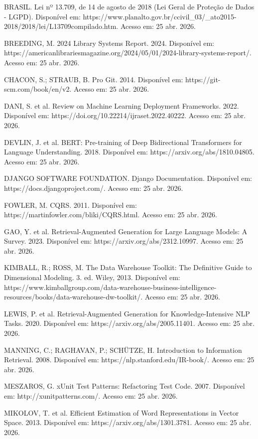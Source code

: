 \documentclass[
]{article}
\begin{document}
BRASIL. Lei nº 13.709, de 14 de agosto de 2018 (Lei Geral de Proteção de
Dados - LGPD). Disponível em:
https://www.planalto.gov.br/ccivil\_03/\_ato2015-2018/2018/lei/L13709compilado.htm.
Acesso em: 25 abr. 2026.

BREEDING, M. 2024 Library Systems Report. 2024. Disponível em:
https://americanlibrariesmagazine.org/2024/05/01/2024-library-systems-report/.
Acesso em: 25 abr. 2026.

CHACON, S.; STRAUB, B. Pro Git. 2014. Disponível em:
https://git-scm.com/book/en/v2. Acesso em: 25 abr. 2026.

DANI, S. et al. Review on Machine Learning Deployment Frameworks. 2022.
Disponível em: https://doi.org/10.22214/ijraset.2022.40222. Acesso em:
25 abr. 2026.

DEVLIN, J. et al. BERT: Pre-training of Deep Bidirectional Transformers
for Language Understanding. 2018. Disponível em:
https://arxiv.org/abs/1810.04805. Acesso em: 25 abr. 2026.

DJANGO SOFTWARE FOUNDATION. Django Documentation. Disponível em:
https://docs.djangoproject.com/. Acesso em: 25 abr. 2026.

FOWLER, M. CQRS. 2011. Disponível em:
https://martinfowler.com/bliki/CQRS.html. Acesso em: 25 abr. 2026.

GAO, Y. et al. Retrieval-Augmented Generation for Large Language Models:
A Survey. 2023. Disponível em: https://arxiv.org/abs/2312.10997. Acesso
em: 25 abr. 2026.

KIMBALL, R.; ROSS, M. The Data Warehouse Toolkit: The Definitive Guide
to Dimensional Modeling. 3. ed. Wiley, 2013. Disponível em:
https://www.kimballgroup.com/data-warehouse-business-intelligence-resources/books/data-warehouse-dw-toolkit/.
Acesso em: 25 abr. 2026.

LEWIS, P. et al. Retrieval-Augmented Generation for Knowledge-Intensive
NLP Tasks. 2020. Disponível em: https://arxiv.org/abs/2005.11401. Acesso
em: 25 abr. 2026.

MANNING, C.; RAGHAVAN, P.; SCHÜTZE, H. Introduction to Information
Retrieval. 2008. Disponível em: https://nlp.stanford.edu/IR-book/.
Acesso em: 25 abr. 2026.

MESZAROS, G. xUnit Test Patterns: Refactoring Test Code. 2007.
Disponível em: http://xunitpatterns.com/. Acesso em: 25 abr. 2026.

MIKOLOV, T. et al. Efficient Estimation of Word Representations in
Vector Space. 2013. Disponível em: https://arxiv.org/abs/1301.3781.
Acesso em: 25 abr. 2026.
\end{document}
